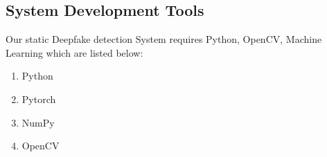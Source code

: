 \subsection{System Development Tools}
Our static Deepfake detection System requires Python, OpenCV,
Machine Learning which are listed below:
\begin{enumerate}
    \item Python
    \item Pytorch
    \item NumPy
    \item OpenCV
\end{enumerate}

